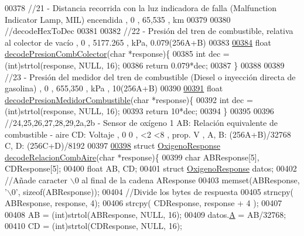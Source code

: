 \begin{DoxyCode}
{{{00378 \textcolor{comment}{//21 - Distancia recorrida con la luz indicadora de falla (Malfunction Indicator Lamp, MIL) encendida , 0 ,
       65,535 , km}
00379 
00380 \textcolor{comment}{//decodeHexToDec}
00381 
00382 \textcolor{comment}{//22 - Presión del tren de combustible, relativa al colector de vacío , 0 , 5177.265 , kPa, 0.079(256A+B)}
00383 
\hyperlink{decoders_8hpp_a3e32aaf8ced989570e141f01210564f3}{00384} \textcolor{keywordtype}{float} \hyperlink{decoders_8cpp_a3e32aaf8ced989570e141f01210564f3}{decodePresionCombColector}(\textcolor{keywordtype}{char} *response)\{
00385     \textcolor{keywordtype}{int} dec = (int)strtol(response, NULL, 16);
00386     \textcolor{keywordflow}{return} 0.079*dec;
00387 \}
00388 
00389 \textcolor{comment}{//23 - Presión del medidor del tren de combustible (Diesel o inyección directa de gasolina) , 0 , 655,350 ,
       kPa , 10(256A+B) }
00390 
\hyperlink{decoders_8hpp_a228605d8cad0901a691ba4155a2326fc}{00391} \textcolor{keywordtype}{float} \hyperlink{decoders_8cpp_a228605d8cad0901a691ba4155a2326fc}{decodePresionMedidorCombustible}(\textcolor{keywordtype}{char} *response)\{
00392     \textcolor{keywordtype}{int} dec = (int)strtol(response, NULL, 16);
00393     \textcolor{keywordflow}{return} 10*dec;
00394 \}
00395 
00396 \textcolor{comment}{//24,25,26,27,28,29,2a,2b - Sensor de oxígeno 1 AB: Relación equivalente de combustible - aire CD: Voltaje
       , 0 0 , <2 <8 , prop. V , A, B: (256A+B)/32768 C, D: (256C+D)/8192   }
00397 
\hyperlink{decoders_8hpp_a363bd4f505969098be58a175f02b9b50}{00398} \textcolor{keyword}{struct }\hyperlink{structOxigenoResponse}{OxigenoResponse} \hyperlink{decoders_8cpp_a363bd4f505969098be58a175f02b9b50}{decodeRelacionCombAire}(char *response)\{
00399     \textcolor{keywordtype}{char} ABResponse[5], CDResponse[5];
00400     \textcolor{keywordtype}{float} AB, CD;
00401     \textcolor{keyword}{struct }\hyperlink{structOxigenoResponse}{OxigenoResponse} datos; 
00402     \textcolor{comment}{//Añade caracter \(\backslash\)0 al final de la cadena AResponse}
00403     memset(ABResponse, \textcolor{charliteral}{'\(\backslash\)0'}, \textcolor{keyword}{sizeof}(ABResponse));
00404     \textcolor{comment}{//Divide los bytes de respuesta}
00405     strncpy( ABResponse, response, 4);
00406     strcpy( CDResponse, response + 4 );
00407 
00408     AB = (int)strtol(ABResponse, NULL, 16);
00409     datos.\hyperlink{structOxigenoResponse_a068c403e5746226cf22bb020b4c786d3}{A} = AB/32768;
00410     CD = (int)strtol(CDResponse, NULL, 16);
}}}
\end{DoxyCode}

